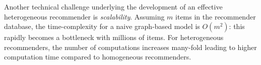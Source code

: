 

 Another technical challenge underlying the development of an effective heterogeneous recommender is \emph{scalability}. Assuming $m$ items in the recommender database, the time-complexity for a naive graph-based model is $O(m^2)$: this rapidly becomes a bottleneck with millions of items. For heterogeneous recommenders, the number of computations increases many-fold leading to higher computation time compared to homogeneous recommenders. %

